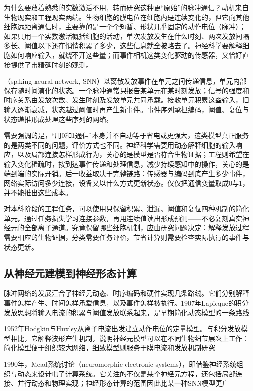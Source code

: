 为什么要放着熟悉的实数激活不用，转而研究这种更“原始”的脉冲通信？动机来自生物现实和工程现实两端。生物细胞的膜电位在细胞内是连续变化的，但它向其他细胞远距离通信时，主要靠的是一个个短暂、形状几乎固定的动作电位（脉冲）；如果只用一个实数激活概括细胞的活动，单次发放发生在什么时刻、两次发放间隔多长、阈值以下还在悄悄积累了多少，这些信息就全被略去了。神经科学要解释细胞如何响应输入，就绕不开这些量；而事件相机这类变化驱动的传感器，又恰好直接提供了带精确时刻的观测。

（spiking neural network, SNN）以离散发放事件在单元之间传递信息，单元内部保存随时间演化的状态。一个脉冲通常只报告某单元在某时刻发放；信号的强度和时序关系由发放次数、发生时刻及发放单元共同承载。接收单元积累这些输入，旧输入逐渐衰减，状态越过阈值时再产生新事件。事件序列承担编码，阈值、复位与状态递推形成处理这些序列的网络。

需要强调的是，“用0和1通信”本身并不自动等于省电或更强大，这类模型真正服务的是两类不同的问题，评价方式也不同。神经科学需要用动态解释细胞的输入响应，以及局部连接怎样形成行为，关心的是模型是否符合生物证据；工程则希望在输入变化稀疏时，按到达事件传递和处理信息，减少持续感知中的操作，关心的是端到端的实际开销。后一收益取决于完整链路：传感器与编码到底产生多少事件，网络实际访问多少连接，设备又以什么方式更新状态。仅仅把通信变量取成0与1，并不能推出这些成本。

对本科阶段的工程任务，可以使用只保留积累、泄漏、阈值和复位四种机制的简化单元，通过任务损失学习连接参数，再用连续值读出形成预测——不必复刻真实神经元的全部离子通道。究竟保留哪些细胞机制，应由研究问题决定：解释发放过程需要相应的生物证据，分类需要任务评价，节省计算则需要检查实际执行的事件与状态更新。

\subsection{从神经元建模到神经形态计算}
\label{sec:snn-early-history}

脉冲网络的发展汇合了神经元动态、时序编码和硬件实现几条路线。它们分别解释事件怎样产生、时间怎样承载信息，以及事件怎样被执行。1907年Lapicque的积分发放思想将输入电流的积累与阈值发放联系起来，是早期简化动态模型的一条路线

1952年Hodgkin与Huxley从离子电流出发建立动作电位的定量模型。与积分发放模型相比，它解释波形产生机制，说明神经元模型可以在不同生物细节层次上工作：简化模型便于组织较大网络，细致模型则服务于膜电流和发放机制研究

1990年，Mead系统讨论（neuromorphic electronic systems），即借鉴神经系统组织与动态来设计电子计算系统。它关注的不仅是某个神经元方程，还包括局部连接、并行动态和物理实现；神经形态计算的范围因此比某一种SNN模型更广


